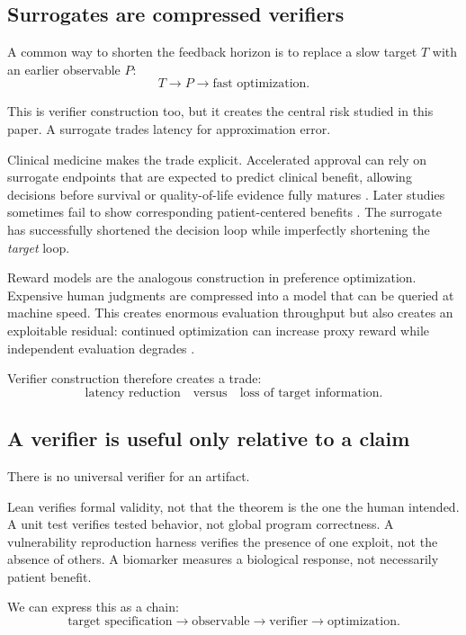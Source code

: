 \subsection{Surrogates are compressed verifiers}

A common way to shorten the feedback horizon is to replace a slow target \(T\) with an
earlier observable \(P\):
\[
    T
    \longrightarrow
    P
    \longrightarrow
    \text{fast optimization}.
\]

This is verifier construction too, but it creates the central risk studied in this
paper.  A surrogate trades latency for approximation error.

Clinical medicine makes the trade explicit.  Accelerated approval can rely on
surrogate endpoints that are expected to predict clinical benefit, allowing decisions
before survival or quality-of-life evidence fully matures
\parencite{gyawali2019accelerated,naci2017accelerated}.  Later studies sometimes fail to
show corresponding patient-centered benefits
\parencite{liu2024clinicalbenefit}.  The surrogate has successfully shortened the
decision loop while imperfectly shortening the \emph{target} loop.

Reward models are the analogous construction in preference optimization.  Expensive
human judgments are compressed into a model that can be queried at machine speed.
This creates enormous evaluation throughput but also creates an exploitable residual:
continued optimization can increase proxy reward while independent evaluation
degrades \parencite{gao2022overoptimization,rafailov2024direct}.

Verifier construction therefore creates a trade:
\[
    \text{latency reduction}
    \quad\text{versus}\quad
    \text{loss of target information}.
\]

\subsection{A verifier is useful only relative to a claim}

There is no universal verifier for an artifact.

Lean verifies formal validity, not that the theorem is the one the human intended.
A unit test verifies tested behavior, not global program correctness.
A vulnerability reproduction harness verifies the presence of one exploit, not the
absence of others.
A biomarker measures a biological response, not necessarily patient benefit.

We can express this as a chain:
\[
\boxed{
\text{target specification}
\rightarrow
\text{observable}
\rightarrow
\text{verifier}
\rightarrow
\text{optimization}.
}
\]

